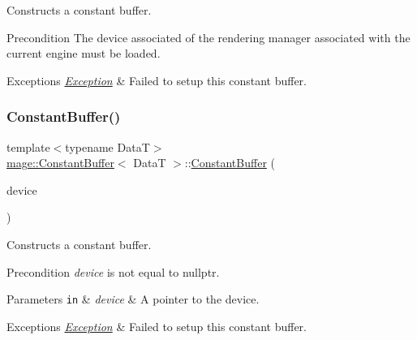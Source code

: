 Constructs a constant buffer.

\begin{DoxyPrecond}{Precondition}
The device associated of the rendering manager associated with the current engine must be loaded. 
\end{DoxyPrecond}

\begin{DoxyExceptions}{Exceptions}
{\em \hyperlink{classmage_1_1_exception}{Exception}} & Failed to setup this constant buffer. \\
\hline
\end{DoxyExceptions}
\hypertarget{classmage_1_1_constant_buffer_aaf32ac894aa2fe73bcbd9033e6e7efb0}{}\label{classmage_1_1_constant_buffer_aaf32ac894aa2fe73bcbd9033e6e7efb0} 
\subsubsection{\texorpdfstring{Constant\+Buffer()}{ConstantBuffer()}\hspace{0.1cm}{\footnotesize\ttfamily [2/4]}}
{\footnotesize\ttfamily template$<$typename DataT$>$ \\
\hyperlink{classmage_1_1_constant_buffer}{mage\+::\+Constant\+Buffer}$<$ DataT $>$\+::\hyperlink{classmage_1_1_constant_buffer}{Constant\+Buffer} (\begin{DoxyParamCaption}\item[{I\+D3\+D11\+Device5 $\ast$}]{device }\end{DoxyParamCaption})\hspace{0.3cm}{\ttfamily [explicit]}}

Constructs a constant buffer.

\begin{DoxyPrecond}{Precondition}
{\itshape device} is not equal to {\ttfamily nullptr}. 
\end{DoxyPrecond}

\begin{DoxyParams}[1]{Parameters}
\mbox{\tt in}  & {\em device} & A pointer to the device. \\
\hline
\end{DoxyParams}

\begin{DoxyExceptions}{Exceptions}
{\em \hyperlink{classmage_1_1_exception}{Exception}} & Failed to setup this constant buffer. \\
\hline
\end{DoxyExceptions}
\hypertarget{classmage_1_1_constant_buffer_a67fe42cb52e63e38474b6c65341fbe82}{}\label{classmage_1_1_constant_buffer_a67fe42cb52e63e38474b6c65341fbe82} 
